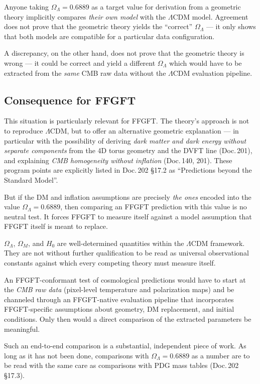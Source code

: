 \begin{important}
Anyone taking \(\Omega_\Lambda = 0.6889\) as a target value for derivation from a geometric theory implicitly compares \emph{their own model} with the \(\Lambda\)CDM model. Agreement does not prove that the geometric theory yields the ``correct'' \(\Omega_\Lambda\) --- it only shows that both models are compatible for a particular data configuration.

A discrepancy, on the other hand, does not prove that the geometric theory is wrong --- it could be correct and yield a different \(\Omega_\Lambda\) which would have to be extracted from the \emph{same} CMB raw data without the \(\Lambda\)CDM evaluation pipeline.
\end{important}

\subsection{Consequence for FFGFT}

This situation is particularly relevant for FFGFT. The theory's approach is not to reproduce \(\Lambda\)CDM, but to offer an alternative geometric explanation --- in particular with the possibility of deriving \emph{dark matter and dark energy without separate components} from the 4D torus geometry and the DVFT line (Doc.\,201), and explaining \emph{CMB homogeneity without inflation} (Doc.\,140, 201). These program points are explicitly listed in Doc.\,202 \S17.2 as ``Predictions beyond the Standard Model''.

But if the DM and inflation assumptions are precisely \emph{the ones} encoded into the value \(\Omega_\Lambda = 0.6889\), then comparing an FFGFT prediction with this value is no neutral test. It forces FFGFT to measure itself against a model assumption that FFGFT itself is meant to replace.

\begin{conclusionBox}
\(\Omega_\Lambda\), \(\Omega_M\), and \(H_0\) are well-determined quantities within the \(\Lambda\)CDM framework. They are not without further qualification to be read as universal observational constants against which every competing theory must measure itself.

An FFGFT-conformant test of cosmological predictions would have to start at the \emph{CMB raw data} (pixel-level temperature and polarization maps) and be channeled through an FFGFT-native evaluation pipeline that incorporates FFGFT-specific assumptions about geometry, DM replacement, and initial conditions. Only then would a direct comparison of the extracted parameters be meaningful.

Such an end-to-end comparison is a substantial, independent piece of work. As long as it has not been done, comparisons with \(\Omega_\Lambda = 0.6889\) as a number are to be read with the same care as comparisons with PDG mass tables (Doc.\,202 \S17.3).
\end{conclusionBox}

